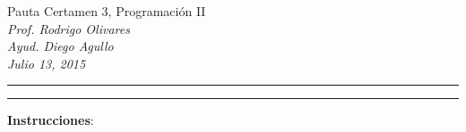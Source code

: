 \documentclass[10pt]{article}
\begin{document}
\begin{center}
    {\Large Pauta Certamen 3, Programaci\'on II} \\
    \emph{\small Prof. Rodrigo Olivares} \\
    \emph{\small Ayud. Diego Agullo} \\
    \emph{\scriptsize Julio 13, 2015}
\end{center}
\vspace*{-35pt}
\begin{center}
    \rule{1\textwidth}{.3pt}
\end{center}
\vspace*{-42pt}
\begin{center}
    \rule{1\textwidth}{2pt}
\end{center}

\vspace*{-15pt}
{\small \textbf{Instrucciones}:}
\vspace*{-15pt}
\end{document}

